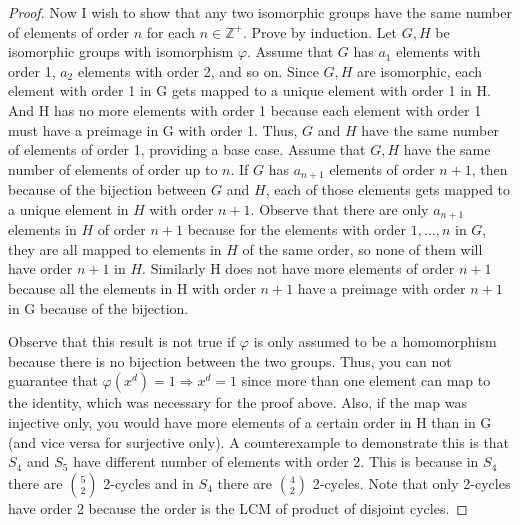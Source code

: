 \documentclass{article}
\begin{document}
\begin{proof}
Now I wish to show that any two isomorphic groups have the same number of elements of order $n$ for each $n \in \mathbb{Z}^+$. Prove by induction. Let $G, H$ be isomorphic groups with isomorphism $\varphi$. Assume that $G$ has $a_1$ elements with order 1, $a_2$ elements with order 2, and so on. Since $G, H$ are isomorphic, each element with order 1 in G gets mapped to a unique element with order 1 in H. And H has no more elements with order 1 because each element with order 1 must have a preimage in G with order 1. Thus, $G$ and $H$ have the same number of elements of order 1, providing a base case. Assume that $G, H$ have the same number of elements of order up to $n$. If $G$ has $a_{n+1}$ elements of order $n+1$, then because of the bijection between $G$ and $H$, each of those elements gets mapped to a unique element in $H$ with order $n+1$. Observe that there are only $a_{n+1}$ elements in $H$ of order $n+1$ because for the elements with order $1,...,n$ in $G$, they are all mapped to elements in $H$ of the same order, so none of them will have order $n+1$ in $H$. Similarly H does not have more elements of order $n+1$ because all the elements in H with order $n+1$ have a preimage with order $n+1$ in G because of the bijection.

Observe that this result is not true if $\varphi$ is only assumed to be a homomorphism because there is no bijection between the two groups. Thus, you can not guarantee that $\varphi(x^d) = 1 \Rightarrow x^d = 1$ since more than one element can map to the identity, which was necessary for the proof above. Also, if the map was injective only, you would have more elements of a certain order in H than in G (and vice versa for surjective only). A counterexample to demonstrate this is that $S_4$ and $S_5$ have different number of elements with order 2. This is because in $S_4$ there are ${5 \choose 2}$ 2-cycles and in $S_4$ there are ${4 \choose 2}$ 2-cycles. Note that only 2-cycles have order 2 because the order is the LCM of product of disjoint cycles.
\end{proof}
\end{document}
